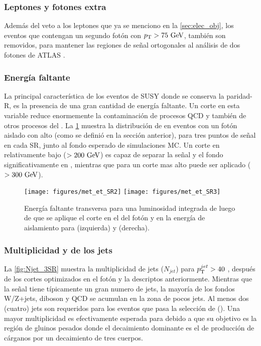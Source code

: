 \subsubsection{Leptones y fotones extra}\label{sec:leptonphoton_veto}

Además del veto a los leptones que ya se menciono en la {\Sec} \ref{sec:elec_obj},
los eventos que contengan un segundo fotón con $\pt>75 \gev$, también
son removidos, para mantener las regiones de señal ortogonales al análisis
de dos fotones de ATLAS \cite{ATLAS-CONF-2014-001}.

\subsubsection{Energía faltante}

La principal característica de los eventos de SUSY donde se conserva
la paridad-R, es la presencia de una gran cantidad de energía faltante.
Un corte en esta variable reduce enormemente la contaminación de procesos
QCD y también de otros procesos del {\SM}.
La {\fig} \ref{fig:MET_3SR} muestra la distribución de {\met} en eventos con
un fotón aislado con alto {\pt} (como se definió en la sección anterior),
para tres puntos de señal en cada SR, junto al fondo esperado de simulaciones
MC. Un corte en {\met} relativamente bajo ($> 200 \gev$) es capaz de separar
la señal y el fondo significativamente en {\SRL}, mientras que para {\SRH}
un corte mas alto puede ser aplicado ($>300\gev$).

\begin{figure}[th!]
  \centering
  \texttt{[image: figures/met\_et\_SR2]}
  \texttt{[image: figures/met\_et\_SR3]}
  \caption{Energía faltante transversa para una luminosidad integrada de {\ilumi}
    luego de que se aplique el corte en el {\pt} del fotón y en la energía de aislamiento
    para {\SRL} (izquierda) y {\SRH} (derecha). }
  \label{fig:MET_3SR}
\end{figure}


\subsubsection{Multiplicidad y {\pt} de los jets} \label{sec:opt_njet}

La {\fig} \ref{fig:Njet_3SR} muestra la multiplicidad de jets ($N_{jet}$) para $p_{\mathrm{T}}^{jet} > 40$ \gev,
después de los cortes optimizados en el fotón y la {\met} descriptos anteriormente.
Mientras que la señal tiene típicamente un gran numero de jets, la mayoría de los
fondos W/Z+jets, diboson y QCD se acumulan en la zona de pocos jets. Al menos
dos (cuatro) jets son requeridos para los eventos que pasa la selección de {\SRL} ({\SRH}).
Una mayor multiplicidad es efectivamente esperada para {\SRL} debido a que su objetivo
es la región de gluinos pesados donde el decaimiento dominante es el de producción de
cárganos por un decaimiento de tres cuerpos.

